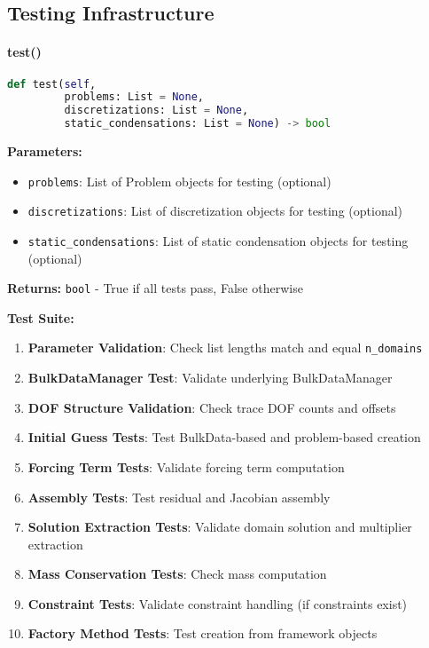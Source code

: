 \subsection{Testing Infrastructure}
\label{subsec:testing_infrastructure}

\paragraph{test()}\leavevmode
\begin{lstlisting}[language=Python, caption=Test Method]
def test(self, 
         problems: List = None,
         discretizations: List = None,
         static_condensations: List = None) -> bool
\end{lstlisting}

\textbf{Parameters:}
\begin{itemize}
    \item \texttt{problems}: List of Problem objects for testing (optional)
    \item \texttt{discretizations}: List of discretization objects for testing (optional)
    \item \texttt{static\_condensations}: List of static condensation objects for testing (optional)
\end{itemize}

\textbf{Returns:} \texttt{bool} - True if all tests pass, False otherwise

\textbf{Test Suite:}
\begin{enumerate}
    \item \textbf{Parameter Validation}: Check list lengths match and equal \texttt{n\_domains}
    \item \textbf{BulkDataManager Test}: Validate underlying BulkDataManager
    \item \textbf{DOF Structure Validation}: Check trace DOF counts and offsets
    \item \textbf{Initial Guess Tests}: Test BulkData-based and problem-based creation
    \item \textbf{Forcing Term Tests}: Validate forcing term computation
    \item \textbf{Assembly Tests}: Test residual and Jacobian assembly
    \item \textbf{Solution Extraction Tests}: Validate domain solution and multiplier extraction
    \item \textbf{Mass Conservation Tests}: Check mass computation
    \item \textbf{Constraint Tests}: Validate constraint handling (if constraints exist)
    \item \textbf{Factory Method Tests}: Test creation from framework objects
\end{enumerate}

